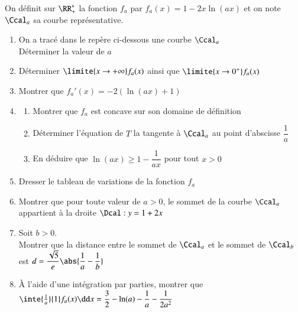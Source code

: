 \documentclass[oneside,12pt]{article}
\begin{document}
On définit sur $\RR_+^*$ la fonction $f_a$ par $f_a(x)=1-2x\ln(ax)$ et on note $\Ccal_a$ sa courbe représentative.

\begin{enumerate}
    \item On a tracé dans le repère ci-dessous une courbe $\Ccal_a$\\
    Déterminer la valeur de $a$ \vspace{5mm}
        \begin{center}
             \vspace{5mm}
        \end{center}
    \item Déterminer $\limite{x\to+\infty}f_a(x)$ ainsi que $\limite{x\to 0^+}f_a(x)$
    \item Montrer que $f_a'(x)=-2(\ln(ax)+1)$
    \item \begin{enumerate}
        \item Montrer que $f_a$ est concave sur son domaine de définition
        \item Déterminer l'équation de $T$ la tangente à $\Ccal_a$ au point d'abscisse $\dfrac{1}{a}$
        \item En déduire que $\ln(ax)\geq1-\dfrac{1}{ax}$ pour tout $x>0$
    \end{enumerate}
    \item Dresser le tableau de variations de la fonction $f_a$
    \item Montrer que pour toute valeur de $a>0$, le sommet de la courbe $\Ccal_a$ appartient à la droite $\Dcal:y=1+2x$
    \item Soit $b>0$.\\
    Montrer que la distance entre le sommet de $\Ccal_a$ et le sommet de $\Ccal_b$ est $d=\dfrac{\sqrt{5}}{e}\abs{\dfrac{1}{a}-\dfrac{1}{b}}$
    \item À l'aide d'une intégration par parties, montrer que $\inte{\frac{1}{a}}{1}f_a(x)\dd x=\dfrac{3}{2}-\ln(a)-\dfrac{1}{a}-\dfrac{1}{2a^2}$
\end{enumerate}
\end{document}
